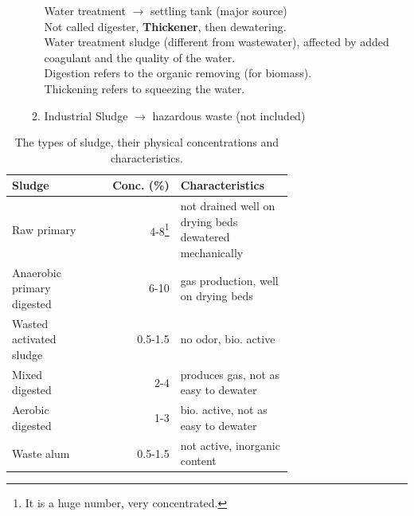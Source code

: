 \documentclass[12pt]{article}
\begin{document}
\begin{itemize}
\begin{enumerate}
    Water treatment $\rightarrow$ settling tank (major source)\\
    Not called digester, \textbf{Thickener}, then dewatering.\\
    Water treatment sludge (different from wastewater), affected by added coagulant and the quality of the water.\\
    Digestion  refers to the organic removing (for biomass).\\
    Thickening refers to squeezing the water.
    \item Industrial Sludge $\rightarrow$ hazardous waste (not included)
    \end{enumerate}
\end{itemize}

\begin{table}[ht]
    \caption{The types of sludge, their physical concentrations and characteristics.}
    \label{tab:table_1}
    \centering
    \begin{tabular}{p{0.3\linewidth}rp{0.4\linewidth}}
        \toprule
        Sludge & Conc. (\%) & Characteristics \\
        \midrule
        Raw primary & 4-8\footnote{It is a huge number, very concentrated.} & not drained well on drying beds \newline dewatered mechanically\\
        Anaerobic primary digested & 6-10 & gas production, well on drying beds\\
        Wasted activated sludge & 0.5-1.5 & no odor, bio. active\\
        Mixed digested & 2-4 & produces gas, not as easy to dewater\\
        Aerobic digested & 1-3 & bio. active, not as easy to dewater\\
        Waste alum & 0.5-1.5 & not active, inorganic content\\
        \bottomrule
    \end{tabular}
\end{table}
\end{document}
